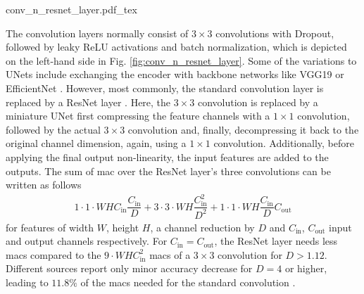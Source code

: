 \begin{center}
	{conv_n_resnet_layer.pdf_tex}
\end{center}
The convolution layers normally consist of $3 \times 3$ convolutions with Dropout, followed by leaky ReLU activations and batch normalization, which is depicted on the left-hand side in Fig. \ref{fig:conv_n_resnet_layer}. Some of the variations to UNets include exchanging the encoder with backbone networks like VGG19 \cite{simonyan2014very,wulff2018early} or EfficientNet \cite{tan2019efficientnet,philion2020lift}. However, most commonly, the standard convolution layer is replaced by a ResNet layer \cite{he2016deep,wirges2018evidential,reiher2020sim2real,roddick2020predicting,philion2020lift}. Here, the $3 \times 3$ convolution is replaced by a miniature UNet first compressing the feature channels with a $1\times 1$ convolution, followed by the actual $3 \times 3$ convolution and, finally, decompressing it back to the original channel dimension, again, using a $1 \times 1$ convolution. Additionally, before applying the final output non-linearity, the input features are added to the outputs. The sum of \gls{mac} over the ResNet layer's three convolutions can be written as follows
\begin{align}
	1\cdot 1\cdot WHC_{\text{in}}\dfrac{C_{\text{in}}}{D} + 3\cdot 3\cdot WH\dfrac{C_{\text{in}}^2}{D^2} +1\cdot 1\cdot WH\dfrac{C_{\text{in}}}{D}C_{\text{out}}
\end{align} 
for features of width $W$, height $H$, a channel reduction by $D$ and $C_{\text{in}}$, $C_{\text{out}}$ input and output channels respectively. For $C_{\text{in}} = C_{\text{out}}$, the ResNet layer needs less \gls{mac}s compared to the $9\cdot WHC_{\text{in}}^2$ \gls{mac}s of a $3 \times 3$ convolution for $D > 1.12$. Different sources report only minor accuracy decrease for $D = 4$ or higher, leading to $11.8\%$ of the \gls{mac}s needed for the standard convolution \cite{he2016deep,Bazarevsky2018}. 
\\\\
